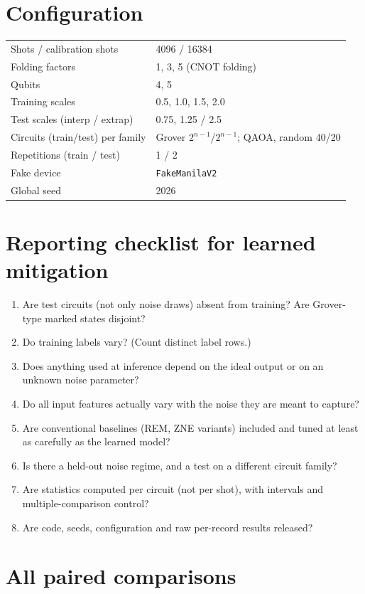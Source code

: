 \documentclass[11pt]{article}
\begin{document}



\appendix
\section{Configuration}
\begin{tabular}{ll}\toprule
Shots / calibration shots & 4096 / 16384\\
Folding factors & 1, 3, 5 (CNOT folding)\\
Qubits & 4, 5\\
Training scales & 0.5, 1.0, 1.5, 2.0\\
Test scales (interp / extrap) & 0.75, 1.25 / 2.5\\
Circuits (train/test) per family & Grover $2^{n-1}$/$2^{n-1}$; QAOA, random 40/20\\
Repetitions (train / test) & 1 / 2\\
Fake device & \texttt{FakeManilaV2}\\
Global seed & 2026\\\bottomrule
\end{tabular}

\section{Reporting checklist for learned mitigation}\label{app:checklist}
\begin{enumerate}
\item Are test circuits (not only noise draws) absent from training? Are Grover-type marked states disjoint?
\item Do training labels vary? (Count distinct label rows.)
\item Does anything used at inference depend on the ideal output or on an unknown noise parameter?
\item Do all input features actually vary with the noise they are meant to capture?
\item Are conventional baselines (REM, ZNE variants) included and tuned at least as carefully as the learned model?
\item Is there a held-out noise regime, and a test on a different circuit family?
\item Are statistics computed per circuit (not per shot), with intervals and multiple-comparison control?
\item Are code, seeds, configuration and raw per-record results released?
\end{enumerate}

\section{All paired comparisons}\label{app:stats}
{\small}
\end{document}
